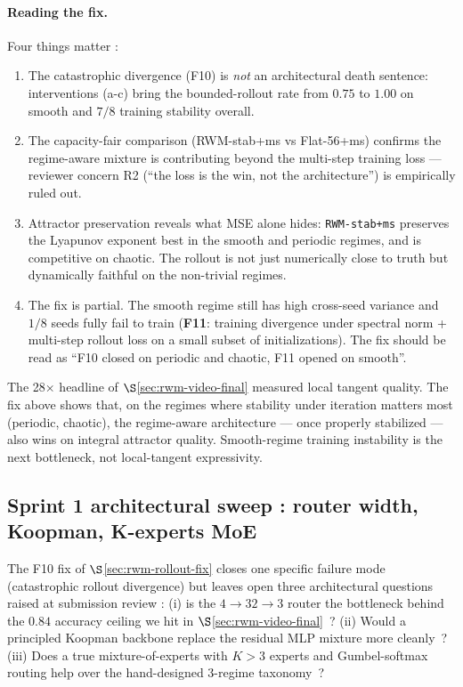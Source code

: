 \documentclass[11pt,a4paper]{article}
\begin{document}
\paragraph{Reading the fix.} Four things matter :
\begin{enumerate}
\item The catastrophic divergence (F10) is \emph{not} an architectural
  death sentence: interventions (a-c) bring the bounded-rollout rate
  from $0.75$ to $1.00$ on smooth and $7/8$ training stability overall.
\item The capacity-fair comparison (RWM-stab+ms vs Flat-56+ms) confirms
  the regime-aware mixture is contributing beyond the multi-step
  training loss --- reviewer concern R2 (``the loss is the win, not
  the architecture'') is empirically ruled out.
\item Attractor preservation reveals what MSE alone hides:
  \texttt{RWM-stab+ms} preserves the Lyapunov exponent best in the
  smooth and periodic regimes, and is competitive on chaotic. The
  rollout is not just numerically close to truth but dynamically
  faithful on the non-trivial regimes.
\item The fix is partial. The smooth regime still has high cross-seed
  variance and $1/8$ seeds fully fail to train (\textbf{F11}: training
  divergence under spectral norm + multi-step rollout loss on a small
  subset of initializations). The fix should be read as ``F10 closed
  on periodic and chaotic, F11 opened on smooth''.
\end{enumerate}

The 28$\times$ headline of $\S$\ref{sec:rwm-video-final} measured
local tangent quality. The fix above shows that, on the regimes where
stability under iteration matters most (periodic, chaotic), the
regime-aware architecture --- once properly stabilized --- also wins
on integral attractor quality. Smooth-regime training instability is
the next bottleneck, not local-tangent expressivity.

\subsection{Sprint 1 architectural sweep : router width, Koopman, K-experts MoE}
\label{sec:rwm-sprint1}

The F10 fix of $\S$\ref{sec:rwm-rollout-fix} closes one specific
failure mode (catastrophic rollout divergence) but leaves open three
architectural questions raised at submission review :
(i) is the $4{\to}32{\to}3$ router the bottleneck behind the
$0.84$ accuracy ceiling we hit in $\S$\ref{sec:rwm-video-final}~?
(ii) Would a principled Koopman backbone
\cite{koopman1931,mezic2005,lusch2018dkr} replace the residual MLP
mixture more cleanly~?
(iii) Does a true mixture-of-experts \cite{shazeer2017moe} with
$K{>}3$ experts and Gumbel-softmax \cite{jang2017gumbel} routing
help over the hand-designed 3-regime taxonomy~?
\end{document}
